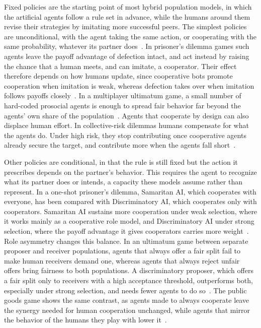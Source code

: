 Fixed policies are the starting point of most hybrid population models, in which the artificial agents follow a rule set in advance, while the humans around them revise their strategies by imitating more successful peers. The simplest policies are unconditional, with the agent taking the same action, or cooperating with the same probability, whatever its partner does~\cite{sharmaSmallBotsBig2023, guoFacilitatingCooperationHumanagent2023, terruchaArtCompensationHow2024}. In prisoner's dilemma games such agents leave the payoff advantage of defection intact, and act instead by raising the chance that a human meets, and can imitate, a cooperator. Their effect therefore depends on how humans update, since cooperative bots promote cooperation when imitation is weak, whereas defection takes over when imitation follows payoffs closely~\cite{sharmaSmallBotsBig2023, guoFacilitatingCooperationHumanagent2023}. In a multiplayer ultimatum game, a small number of hard-coded prosocial agents is enough to spread fair behavior far beyond the agents' own share of the population~\cite{santosEvolutionCollectiveFairness2019}. Agents that cooperate by design can also displace human effort. In collective-risk dilemmas humans compensate for what the agents do. Under high risk, they stop contributing once cooperative agents already secure the target, and contribute more when the agents fall short~\cite{terruchaArtCompensationHow2024}.

Other policies are conditional, in that the rule is still fixed but the action it prescribes depends on the partner's behavior. This requires the agent to recognize what its partner does or intends, a capacity these models assume rather than represent. In a one-shot prisoner's dilemma, Samaritan AI, which cooperates with everyone, has been compared with Discriminatory AI, which cooperates only with cooperators. Samaritan AI sustains more cooperation under weak selection, where it works mainly as a cooperative role model, and Discriminatory AI under strong selection, where the payoff advantage it gives cooperators carries more weight~\cite{zimmaroEmergenceCooperationOneshot2024}. Role asymmetry changes this balance. In an ultimatum game between separate proposer and receiver populations, agents that always offer a fair split fail to make human receivers demand one, whereas agents that always reject unfair offers bring fairness to both populations. A discriminatory proposer, which offers a fair split only to receivers with a high acceptance threshold, outperforms both, especially under strong selection, and needs fewer agents to do so~\cite{songEvolutionFairnessHybrid2026}. The public goods game shows the same contrast, as agents made to always cooperate leave the synergy needed for human cooperation unchanged, while agents that mirror the behavior of the humans they play with lower it~\cite{hintzePromotingCooperationPublic2026}.

